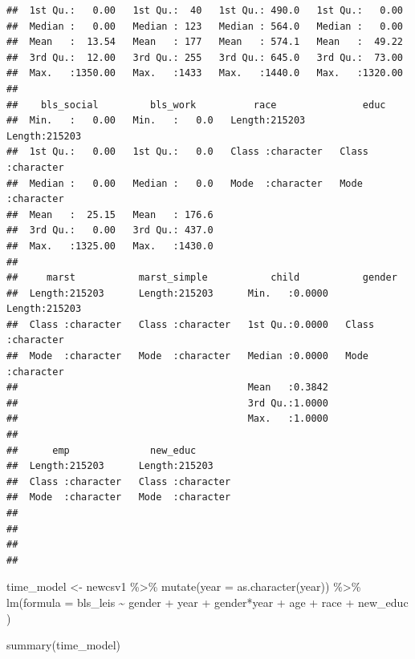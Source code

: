 \documentclass[
]{article}
\newenvironment{Shaded}{\begin{snugshade}}{\end{snugshade}}
\newcommand{\AttributeTok}[1]{\textcolor[rgb]{0.77,0.63,0.00}{#1}}
\newcommand{\FunctionTok}[1]{\textcolor[rgb]{0.00,0.00,0.00}{#1}}
\newcommand{\NormalTok}[1]{#1}
\newcommand{\OtherTok}[1]{\textcolor[rgb]{0.56,0.35,0.01}{#1}}
\newcommand{\SpecialCharTok}[1]{\textcolor[rgb]{0.00,0.00,0.00}{#1}}
\begin{document}
\begin{verbatim}
##  1st Qu.:   0.00   1st Qu.:  40   1st Qu.: 490.0   1st Qu.:   0.00  
##  Median :   0.00   Median : 123   Median : 564.0   Median :   0.00  
##  Mean   :  13.54   Mean   : 177   Mean   : 574.1   Mean   :  49.22  
##  3rd Qu.:  12.00   3rd Qu.: 255   3rd Qu.: 645.0   3rd Qu.:  73.00  
##  Max.   :1350.00   Max.   :1433   Max.   :1440.0   Max.   :1320.00  
##                                                                     
##    bls_social         bls_work          race               educ          
##  Min.   :   0.00   Min.   :   0.0   Length:215203      Length:215203     
##  1st Qu.:   0.00   1st Qu.:   0.0   Class :character   Class :character  
##  Median :   0.00   Median :   0.0   Mode  :character   Mode  :character  
##  Mean   :  25.15   Mean   : 176.6                                        
##  3rd Qu.:   0.00   3rd Qu.: 437.0                                        
##  Max.   :1325.00   Max.   :1430.0                                        
##                                                                          
##     marst           marst_simple           child           gender         
##  Length:215203      Length:215203      Min.   :0.0000   Length:215203     
##  Class :character   Class :character   1st Qu.:0.0000   Class :character  
##  Mode  :character   Mode  :character   Median :0.0000   Mode  :character  
##                                        Mean   :0.3842                     
##                                        3rd Qu.:1.0000                     
##                                        Max.   :1.0000                     
##                                                                           
##      emp              new_educ        
##  Length:215203      Length:215203     
##  Class :character   Class :character  
##  Mode  :character   Mode  :character  
##                                       
##                                       
##                                       
## 
\end{verbatim}

\begin{Shaded}
\begin{Highlighting}[]
\NormalTok{time\_model }\OtherTok{\textless{}{-}}\NormalTok{ newcsv1 }\SpecialCharTok{\%\textgreater{}\%}
  \FunctionTok{mutate}\NormalTok{(}\AttributeTok{year =} \FunctionTok{as.character}\NormalTok{(year)) }\SpecialCharTok{\%\textgreater{}\%}
  \FunctionTok{lm}\NormalTok{(}\AttributeTok{formula =}\NormalTok{ bls\_leis }\SpecialCharTok{\textasciitilde{}}\NormalTok{ gender }\SpecialCharTok{+}\NormalTok{ year }\SpecialCharTok{+}\NormalTok{ gender}\SpecialCharTok{*}\NormalTok{year }\SpecialCharTok{+}\NormalTok{ age }\SpecialCharTok{+}\NormalTok{ race }\SpecialCharTok{+}\NormalTok{ new\_educ ) }

\FunctionTok{summary}\NormalTok{(time\_model)}
\end{Highlighting}
\end{Shaded}
\end{document}
